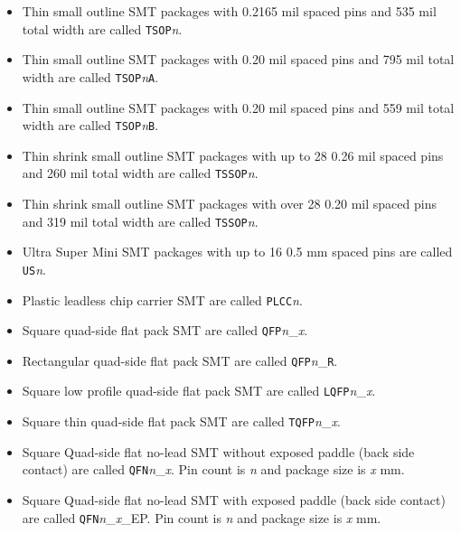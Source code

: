 \documentclass{article}
\begin{document}
\begin{itemize}
\item   Thin small outline SMT packages with 0.2165 mil spaced pins and
	535 mil total width are called {\tt TSOP}{\it n}.

\item   Thin small outline SMT packages with 0.20 mil spaced pins and
	795 mil total width are called {\tt TSOP}{\it n}{\tt A}.

\item   Thin small outline SMT packages with 0.20 mil spaced pins and
	559 mil total width are called {\tt TSOP}{\it n}{\tt B}.

\item   Thin shrink small outline SMT packages with up to 28 0.26 mil
	spaced pins and 260 mil total width are called {\tt TSSOP}{\it n}.

\item   Thin shrink small outline SMT packages with over 28 0.20 mil
	spaced pins and 319 mil total width are called {\tt TSSOP}{\it n}.

\item   Ultra Super Mini SMT packages with up to 16 0.5 mm spaced pins
	are called {\tt US}{\it n}.

\item   Plastic leadless chip carrier SMT are called {\tt PLCC}{\it n}.

\item   Square quad-side flat pack SMT are called 
        {\tt QFP}{\it n}\_{\it x}.

\item   Rectangular quad-side flat pack SMT are called 
        {\tt QFP}{\it n}\_{\tt R}.

\item   Square low profile quad-side flat pack SMT are called 
        {\tt LQFP}{\it n}\_{\it x}.

\item   Square thin quad-side flat pack SMT are called 
        {\tt TQFP}{\it n}\_{\it x}.

\item   Square Quad-side flat no-lead SMT without exposed
	paddle (back side contact) are called
        {\tt QFN}{\it n}\_{\it x}.  Pin count is {\it n} and
	package size is {\it x} mm.

\item   Square Quad-side flat no-lead SMT with exposed
	paddle (back side contact) are called
        {\tt QFN}{\it n}\_{\it x}_EP.  Pin count is {\it n} and
	package size is {\it x} mm.


\end{itemize}
\end{document}
